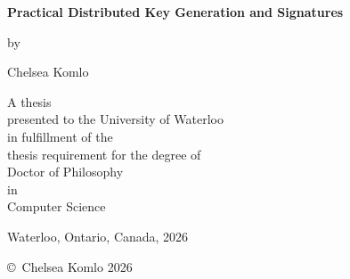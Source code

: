 \pagestyle{empty}

\begin{titlepage}
        \begin{center}
        \vspace*{1.0cm}

        \Huge
        {\bf Practical Distributed Key Generation and Signatures}

        \vspace*{1.0cm}

        \normalsize
        by \\

        \vspace*{1.0cm}

        \Large
        Chelsea Komlo \\

        \vspace*{3.0cm}

        \normalsize
        A thesis \\
        presented to the University of Waterloo \\
        in fulfillment of the \\
        thesis requirement for the degree of \\
        Doctor of Philosophy \\
        in \\
        Computer Science \\

        \vspace*{2.0cm}

        Waterloo, Ontario, Canada, 2026 \\

        \vspace*{1.0cm}

        \copyright\ Chelsea Komlo 2026 \\
        \end{center}
\end{titlepage}

\pagestyle{plain}
\setcounter{page}{2}

